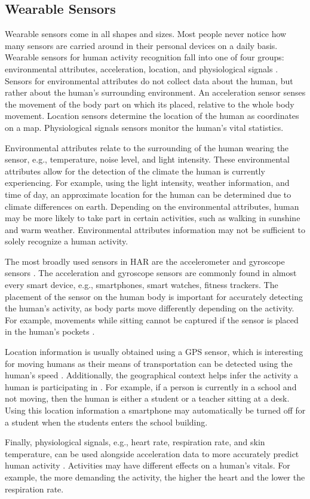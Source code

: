 \subsection{Wearable Sensors}
Wearable sensors come in all shapes and sizes. Most people never notice how many sensors are carried around in their personal devices on a daily basis. Wearable sensors for human activity recognition fall into one of four groups: environmental attributes, acceleration, location, and physiological signals \cite{Lara2013}. Sensors for environmental attributes do not collect data about the human, but rather about the human's surrounding environment. An acceleration sensor senses the movement of the body part on which its placed, relative to the whole body movement. Location sensors determine the location of the human as coordinates on a map. Physiological signals sensors monitor the human's vital statistics.
\par Environmental attributes relate to the surrounding of the human wearing the sensor, e.g., temperature, noise level, and light intensity. These environmental attributes allow for the detection of the climate the human is currently experiencing. For example, using the light intensity, weather information, and time of day, an approximate location for the human can be determined due to climate differences on earth. Depending on the environmental attributes, human may be more likely to take part in certain activities, such as walking in sunshine and warm weather. Environmental attributes information may not be sufficient to solely recognize a human activity.
\par The most broadly used sensors in HAR are the accelerometer and gyroscope sensors \cite{Lara2013}. The acceleration and gyroscope sensors are commonly found in almost every smart device, e.g., smartphones, smart watches, fitness trackers. The placement of the sensor on the human body is important for accurately detecting the human's activity, as body parts move differently depending on the activity. For example, movements while sitting cannot be captured if the sensor is placed in the human's pockets \cite{Maurer2006}.
\par Location information is usually obtained using a GPS sensor, which is interesting for moving humans as their means of transportation can be detected using the human's speed \cite{Zheng2008}. Additionally, the geographical context helps infer the activity a human is participating in \cite{liao2006location}. For example, if a person is currently in a school and not moving, then the human is either a student or a teacher sitting at a desk. Using this location information a smartphone may automatically be turned off for a student when the students enters the school building.
\par Finally, physiological signals, e.g., heart rate, respiration rate, and skin temperature, can be used alongside acceleration data to more accurately predict human activity \cite{Lara2012}. Activities may have different effects on a human's vitals. For example, the more demanding the activity, the higher the heart and the lower the respiration rate.

